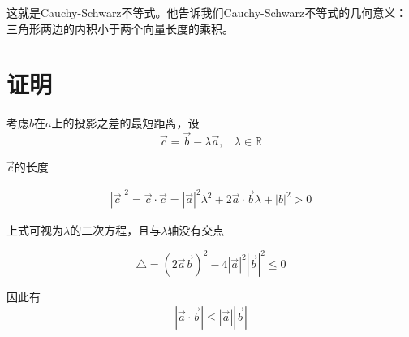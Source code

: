 这就是Cauchy-Schwarz不等式。他告诉我们Cauchy-Schwarz不等式的几何意义：三角形两边的内积小于两个向量长度的乘积。

\section{证明}

考虑$b$在$a$上的投影之差的最短距离，设
\begin{equation}
    \overrightarrow{c}=\vec{b}-\lambda \vec{a},\ \ \ \ \lambda\in \mathbb{R}
\end{equation}

$\vec{c}$的长度

\begin{eqnarray}
    |\vec{c}|^2=\vec{c}\cdot \vec{c}=|\vec{a}|^2\lambda^2+2\vec{a}\cdot \vec{b}\lambda +|b|^2>0
\end{eqnarray}

上式可视为$\lambda$的二次方程，且与$\lambda$轴没有交点

\begin{equation}
    \bigtriangleup = (2\vec{a}\vec{b})^2-4|\vec{a}|^2|\vec{b}|^2\leqslant 0
\end{equation}

因此有
\begin{equation}
    |\vec{a}\cdot \vec{b}|\leqslant |\vec{a}||\vec{b}|
\end{equation}